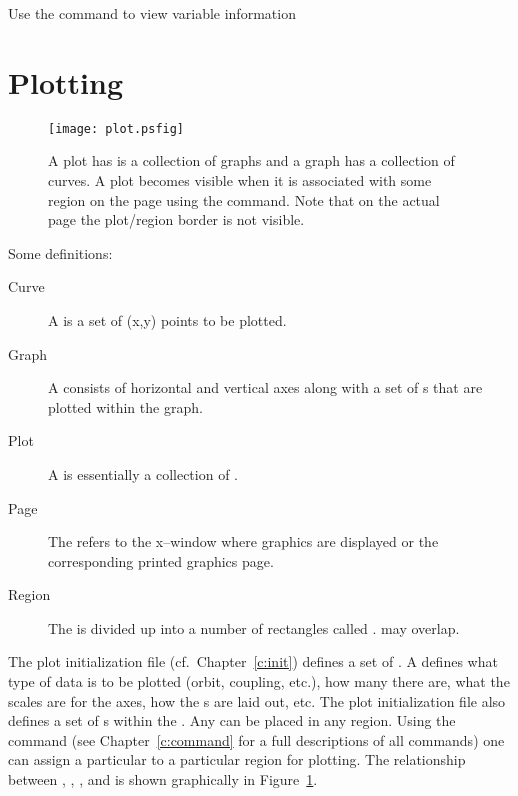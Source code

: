 Use the  command to view variable information

\vfill
\break
\section{Plotting}

\begin{figure}
  \centering
  \texttt{[image: plot.psfig]}
  \caption{A plot has is a collection of graphs and a graph has a 
collection of curves. A plot becomes visible when it is associated
with some region on the page using the  command. Note that
on the actual page the plot/region border is not visible.}
  \label{f:plot}
\end{figure}

Some definitions:
  \vspace*{-3ex}
\begin{description}
\item[Curve] \Newline
A  is a set of (x,y) points to be plotted.
\item[Graph] \Newline
A  consists of horizontal and vertical axes along with a set
of s that are plotted within the graph. 
\item[Plot] \Newline
A  is essentially a collection of .
\item[Page] \Newline
The  refers to the x--window where graphics are displayed or the 
corresponding printed graphics page.
\item[Region] \Newline
The  is divided up into a number of rectangles called
.  may overlap.
\end{description}

The plot initialization file (cf.~Chapter~\ref{c:init}) defines a set
of . A  defines what type of data is
to be plotted (orbit, coupling, etc.), how many  there are,
what the scales are for the  axes, how the s are
laid out, etc.  The plot initialization file also defines a set of
s within the . Any  can be
placed in any region. Using the  command (see
Chapter~\ref{c:command} for a full descriptions of all commands) one
can assign a particular  to a particular region for
plotting.  The relationship between , ,
, and  is shown graphically in
Figure~\ref{f:plot}.

